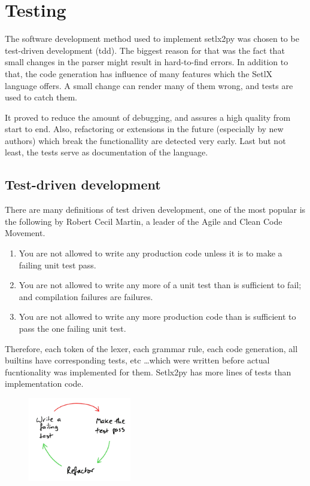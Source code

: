 \section{Testing}

The software development method used to implement setlx2py was chosen to be test-driven development (\gls{tdd}). The biggest reason for that was the fact that small changes in the parser might result in hard-to-find errors. In addition to that, the code generation has influence of many features which the SetlX language offers. A small change can render many of them wrong, and tests are used to catch them.

It proved to reduce the amount of debugging, and assures a high quality from start to end. Also, refactoring or extensions in the future (especially by new authors) which break the functionallity are detected very early. Last but not least, the tests serve as documentation of the language.

\subsection{Test-driven development}

There are many definitions of test driven development, one of the most popular is the following by Robert Cecil Martin, a leader of the Agile and Clean Code Movement.


\begin{enumerate}
\item You are not allowed to write any production code unless it is to make a failing unit test pass.
\item You are not allowed to write any more of a unit test than is sufficient to fail; and compilation failures are failures.
\item You are not allowed to write any more production code than is sufficient to pass the one failing unit test.
\end{enumerate}

Therefore, each token of the lexer, each grammar rule, each code generation, all builtins have corresponding tests, etc \ldots which were written before actual fucntionality was implemented for them. Setlx2py has more lines of tests than implementation code.


\begin{figure}[htb]
	\centering
	\includegraphics[width=0.4\textwidth]{img/tdd-circle.png}
\end{figure}

